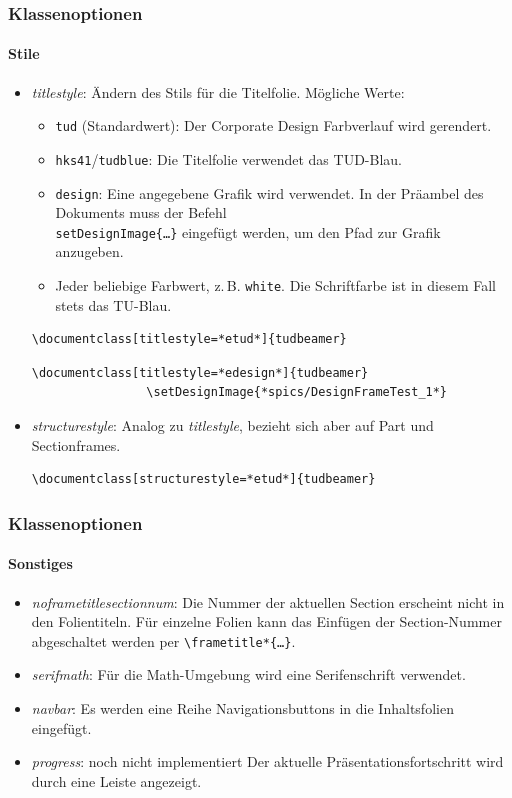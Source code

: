 \documentclass[german,notoc]{tudbeamer}%
\begin{document}
\begin{frame}[fragile]
	\frametitle{Klassenoptionen}
	\framesubtitle{Stile}
	\begin{itemize}
		\item \emph{titlestyle}: Ändern des Stils für die Titelfolie. Mögliche Werte:
			\begin{itemize}
				\item \texttt{tud} (Standardwert): Der Corporate Design Farbverlauf wird gerendert.
				\item \texttt{hks41}/\texttt{tudblue}: Die Titelfolie verwendet das TUD-Blau.
				\item \texttt{design}: Eine angegebene Grafik wird verwendet. In der Präambel des Dokuments muss der Befehl \texttt{\\setDesignImage\{\dots\}} eingefügt werden, um den Pfad zur Grafik anzugeben.
				\item Jeder beliebige Farbwert, z.\,B. \texttt{white}. Die Schriftfarbe ist in diesem Fall stets das TU-Blau.
			\end{itemize}
			\begin{lstlisting}[gobble=8,style=latex,numbers=none]
				\documentclass[titlestyle=*etud*]{tudbeamer}
			\end{lstlisting} 
			\begin{lstlisting}[gobble=8,style=latex]
				\documentclass[titlestyle=*edesign*]{tudbeamer}
				\setDesignImage{*spics/DesignFrameTest_1*}
			\end{lstlisting} 
		\item \emph{structurestyle}: Analog zu \emph{titlestyle}, bezieht sich aber auf Part und Sectionframes.
			\begin{lstlisting}[gobble=8,style=latex,numbers=none]
				\documentclass[structurestyle=*etud*]{tudbeamer}
			\end{lstlisting} 
	\end{itemize}
\end{frame}
\begin{frame}
	\frametitle{Klassenoptionen}
	\framesubtitle{Sonstiges}
	\begin{itemize}
		\item \emph{noframetitlesectionnum}: Die Nummer der aktuellen Section erscheint nicht in den Folientiteln. Für einzelne Folien kann das Einfügen der Section-Nummer abgeschaltet werden per \texttt{\textbackslash frametitle*\{\dots\}}.
		\item \emph{serifmath}: Für die Math-Umgebung wird eine Serifenschrift verwendet.
		\item \emph{navbar}: Es werden eine Reihe Navigationsbuttons in die Inhaltsfolien eingefügt.
		\item \emph{progress}: {\color{alert} noch nicht implementiert} Der aktuelle Präsentationsfortschritt wird durch eine Leiste angezeigt.
	\end{itemize}
\end{frame}
\end{document}
